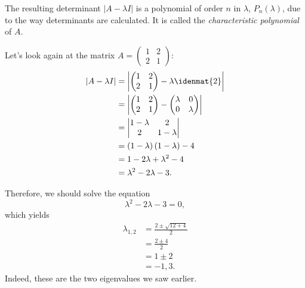 The resulting determinant $\left| A-\lambda I \right|$ is a polynomial of order $n$ in $\lambda$, $P_{n}\left( \lambda \right)$, due to the way determinants are calculated. It is called the \emph{characteristic polynomial} of $A$.

\begin{example}
  Let's look again at the matrix $A=\begin{pmatrix} 1 & 2 \\ 2 & 1 \end{pmatrix}$:
  \begin{align*}
	\left| A-\lambda I\right| &= \left| \begin{pmatrix} 1 & 2 \\ 2 & 1 \end{pmatrix} -\lambda \idenmat{2}\right|\\
	&= \left| \begin{pmatrix} 1 & 2 \\ 2 & 1 \end{pmatrix} - \begin{pmatrix} \lambda & 0 \\ 0 & \lambda \end{pmatrix} \right|\\
	&= \begin{vmatrix} 1-\lambda & 2 \\ 2 & 1-\lambda \end{vmatrix}\\
	&= \left( 1-\lambda \right)\left( 1-\lambda \right) - 4\\
	&= 1-2\lambda + \lambda^{2} - 4\\
	&= \lambda^{2}-2\lambda-3.
  \end{align*}

  Therefore, we should solve the equation
  \begin{equation*}
	\lambda^{2}-2\lambda-3 = 0,
  \end{equation*}
  which yields
  \begin{align*}
	\lambda_{1,2} &= \frac{2\pm\sqrt{12+4}}{2}\\
	&= \frac{2\pm4}{2}\\
	&= 1\pm2\\
	&= -1,3.
  \end{align*}
  Indeed, these are the two eigenvalues we saw earlier.
\end{example}

